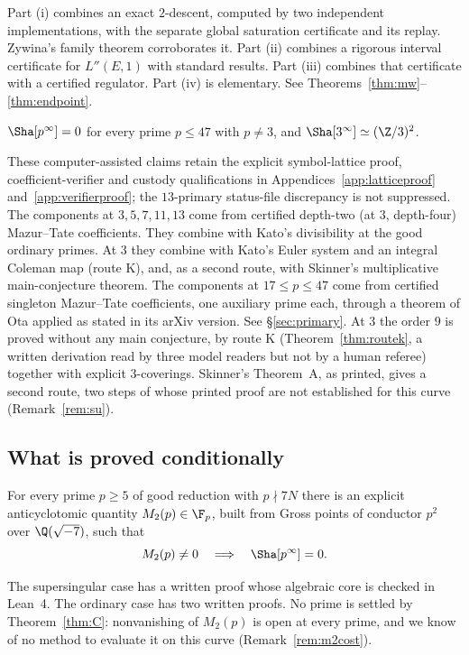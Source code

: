 Part (i) combines an exact $2$-descent, computed by two independent implementations, with the separate global saturation certificate and its replay. Zywina's family theorem \cite{zywina} corroborates it. Part (ii) combines a rigorous interval certificate for $L''(E,1)$ with standard results. Part (iii) combines that certificate with a certified regulator. Part (iv) is elementary. See Theorems~\ref{thm:mw}--\ref{thm:endpoint}.

\begin{theorem}\label{thm:B}
$\Sha[p^\infty]=0$ for every prime $p\le47$ with $p\ne3$, and $\Sha[3^\infty]\simeq(\Z/3)^2$.
\end{theorem}

These computer-assisted claims retain the explicit symbol-lattice proof, coefficient-verifier and custody qualifications in Appendices~\ref{app:latticeproof} and~\ref{app:verifierproof}; the $13$-primary status-file discrepancy is not suppressed. The components at $3,5,7,11,13$ come from certified depth-two (at $3$, depth-four) Mazur--Tate coefficients. They combine with Kato's divisibility at the good ordinary primes. At $3$ they combine with Kato's Euler system and an integral Coleman map (route K), and, as a second route, with Skinner's multiplicative main-conjecture theorem. The components at $17\le p\le47$ come from certified singleton Mazur--Tate coefficients, one auxiliary prime each, through a theorem of Ota \cite{ota} applied as stated in its arXiv version. See \S\ref{sec:primary}. At $3$ the order $9$ is proved without any main conjecture, by route K (Theorem~\ref{thm:routek}, a written derivation read by three model readers but not by a human referee) together with explicit $3$-coverings. Skinner's Theorem~A, as printed, gives a second route, two steps of whose printed proof are not established for this curve (Remark~\ref{rem:su}).

\subsection{What is proved conditionally}
\begin{theorem}\label{thm:C}
For every prime $p\ge5$ of good reduction with $p\nmid 7N$ there is an explicit anticyclotomic quantity $M_2(p)\in\F_p$, built from Gross points of conductor $p^2$ over $\Q(\sqrt{-7})$, such that
\[
M_2(p)\neq0\quad\Longrightarrow\quad \Sha[p^\infty]=0 .
\]
\end{theorem}
The supersingular case has a written proof whose algebraic core is checked in Lean~4. The ordinary case has two written proofs. No prime is settled by Theorem~\ref{thm:C}: nonvanishing of $M_2(p)$ is open at every prime, and we know of no method to evaluate it on this curve (Remark~\ref{rem:m2cost}).


